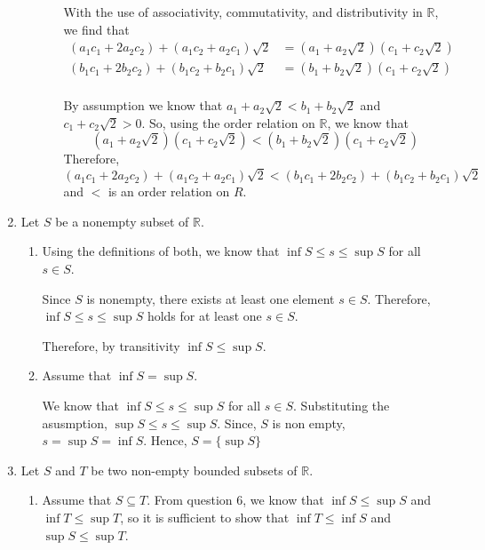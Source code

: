 \documentclass[12pt]{article}
\begin{document}
\begin{enumerate}[start=1,label={\bfseries Problem \arabic*:},leftmargin=1in]
\begin{enumerate}
\begin{itemize}
                With the use of associativity, commutativity, and distributivity in $\mathbb{R}$, we find that 
                \begin{align*}
                    (a_{1}c_{1} + 2a_{2}c_{2}) + (a_{1}c_{2} + a_{2}c_{1})\sqrt{2} &= (a_{1} + a_{2}\sqrt{2})(c_{1} + c_{2}\sqrt{2})\\ 
                    (b_{1}c_{1} + 2b_{2}c_{2}) + (b_{1}c_{2} + b_{2}c_{1})\sqrt{2} &= (b_{1} + b_{2}\sqrt{2})(c_{1} + c_{2}\sqrt{2})\\ 
                \end{align*}
                
                By assumption we know that $a_{1} + a_{2}\sqrt{2} < b_{1} + b_{2}\sqrt{2}$ and $c_{1} + c_{2}\sqrt{2} > 0$. So, using the order relation on $\mathbb{R}$, 
                we know that 
                \[
                    (a_{1} + a_{2}\sqrt{2})(c_{1} + c_{2}\sqrt{2}) < (b_{1} + b_{2}\sqrt{2})(c_{1} + c_{2}\sqrt{2})
                \]
                Therefore, 
                \[
                    (a_{1}c_{1} + 2a_{2}c_{2}) + (a_{1}c_{2} + a_{2}c_{1})\sqrt{2} < (b_{1}c_{1} + 2b_{2}c_{2}) + (b_{1}c_{2} + b_{2}c_{1})\sqrt{2}
                \]
                and $<$ is an order relation on $R$.
            \end{itemize}
    \end{enumerate}

    \item Let $S$ be a nonempty subset of $\mathbb{R}$. 
    \begin{enumerate}
        \item  Using the definitions of both, we know that $\inf S \leq s \leq \sup S$ for all $s \in S$. 

        Since $S$ is nonempty, there exists at least one element $s \in S$. Therefore, $\inf S \leq s \leq \sup S$ holds for at least one $s \in S$. 

        Therefore, by transitivity $\inf S \leq \sup S$.

        \item Assume that $\inf S = \sup S$. 
        
        We know that $\inf S \leq s \leq \sup  S$ for all $s \in S$. Substituting the asusmption, 
        $\sup  S \leq s \leq \sup S$. Since, $S$ is non empty, $s = \sup S = \inf S$. Hence, $S = \{ \sup  S \}$
    \end{enumerate}

    \item Let $S$ and $T$ be two non-empty bounded subsets of $\mathbb{R}$. 
    \begin{enumerate}
        \item Assume that $S \subseteq T$. 
        From question 6, we know that $\inf S \leq \sup S$ and $\inf T \leq \sup  T$, so it is sufficient to show that $\inf T \leq \inf S$ and $\sup S \leq \sup T$. 


\end{enumerate}
\end{enumerate}
\end{document}
